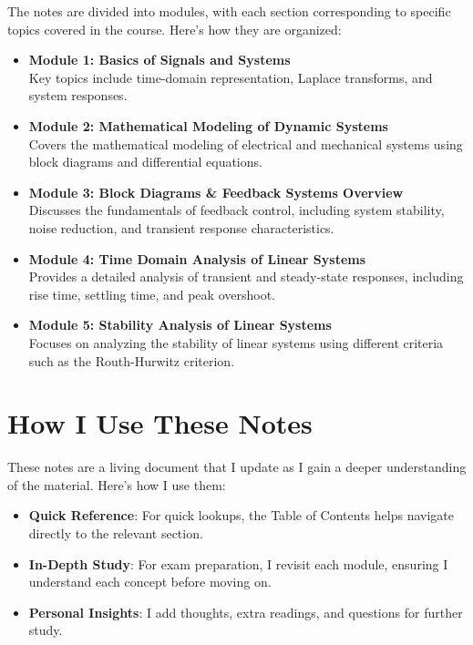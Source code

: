 \documentclass[
  12pt,
  a4paper,
]{report}
\providecommand{\tightlist}{%
  \setlength{\itemsep}{0pt}\setlength{\parskip}{0pt}}\usepackage{longtable,booktabs,array}
\begin{document}

The notes are divided into modules, with each section corresponding to
specific topics covered in the course. Here's how they are organized:

\begin{itemize}
\item
  \textbf{Module 1: Basics of Signals and Systems}\\
  Key topics include time-domain representation, Laplace transforms, and
  system responses.
\item
  \textbf{Module 2: Mathematical Modeling of Dynamic Systems}\\
  Covers the mathematical modeling of electrical and mechanical systems
  using block diagrams and differential equations.
\item
  \textbf{Module 3: Block Diagrams \& Feedback Systems Overview}\\
  Discusses the fundamentals of feedback control, including system
  stability, noise reduction, and transient response characteristics.
\item
  \textbf{Module 4: Time Domain Analysis of Linear Systems}\\
  Provides a detailed analysis of transient and steady-state responses,
  including rise time, settling time, and peak overshoot.
\item
  \textbf{Module 5: Stability Analysis of Linear Systems}\\
  Focuses on analyzing the stability of linear systems using different
  criteria such as the Routh-Hurwitz criterion.
\end{itemize}


\chapter*{How I Use These Notes}\label{how-i-use-these-notes}


These notes are a living document that I update as I gain a deeper
understanding of the material. Here's how I use them:

\begin{itemize}
\tightlist
\item
  \textbf{Quick Reference}: For quick lookups, the Table of Contents
  helps navigate directly to the relevant section.
\item
  \textbf{In-Depth Study}: For exam preparation, I revisit each module,
  ensuring I understand each concept before moving on.
\item
  \textbf{Personal Insights}: I add thoughts, extra readings, and
  questions for further study.
\end{itemize}
\end{document}
